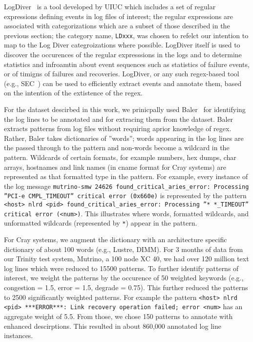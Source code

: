 LogDiver~\cite{LogDiver} is a tool developed by UIUC which includes a set of regular expressions defining
events in log files of interest; the regular expressions are associated with categorizations
which are a subset of those described in the previous section; the
category name, \texttt{LDxxx}, was chosen to refelct our intention to map to the
Log Diver categroizations where possible.
LogDiver itself is used to discover the occurences of the regular
expresssions in the logs and to determine statistics and infroamtin about event sequences
such as statistics of failure events, or of timigns of failures and recoveries.
LogDiver, or any such regex-based tool (e.g., SEC~\cite{SEC}) can be used to efficiently extract events
and annotate them, based on the intention of the extistence of the regex.

For the dataset descirbed in this work, we prinicpally used Baler~\cite{Baler} for
identifying the log lines to be annotated and for extracing them from the dataset.
Baler extracts patterns from log files without requiring aprior knowledge of
regex. Rather, Baler takes dictionaries of ''words''; words appearing in the log lines
are the passed through to the pattern and non-words become a wildcard in the pattern.
Wildcards of certain formats, for example numbers, hex dumps, char arrays, hostnames and link names
(in cname format for Cray systems) are represented as that formatted type in the pattern.
For example, every instance of the log message \texttt{mutrino-smw 24626 found\_critical\_aries\_error: Processing ''PCI-e CMPL\_TIMEOUT'' critical error (0x660e)}
is represented by the pattern \texttt{<host> nlrd <pid> found\_critical\_aries\_error: Processing ''* *\_TIMEOUT'' critical error (<num>)}.
This illustrates where words, formatted wildcards, and unformatted wildcards (represented by \texttt{*}) appear in the pattern.

For Cray systems, we augment
the dictionary with an architecture specific dictionary of about 100 words (e.g., Lustre, DIMM).
For 3 months of data from our Trinity test system, Mutrino, a 100 node XC 40,
we had over 120 million text log lines which were reduced to 15500 patterns. To further identify patterns
of interest, we weight the patterns by the occurence of 50 weighted
keywords (e.g., congestion = 1.5, error = 1.5, degrade = 0.75). This further reduced the patterns
to 2500 significantly weighted patterns. For example the pattern
\texttt{<host> nlrd <pid> ***ERROR***: Link recovery operation failed; error <num>} has
an aggregate weight of 5.5. From those, we chose 150
patterns to annotate with enhanced descirptions. This resulted in about 860,000
annotated log line instances.

